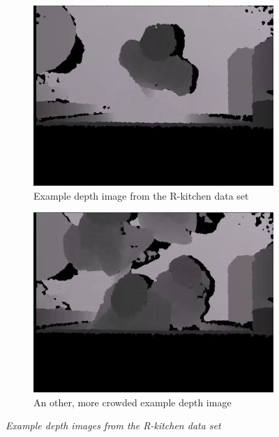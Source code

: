 \begin{figure}[H]
\centering
\begin{subfigure}{.5\textwidth}
  \centering
  \includegraphics[width=0.9\linewidth]{images/R-kitchen1.png}
  \caption{Example depth image from the R-kitchen data set}
  \label{fig:sub1}
\end{subfigure}%
\begin{subfigure}{.5\textwidth}
  \centering
  \includegraphics[width=0.9\linewidth]{images/R-kitchen2.png}
  \caption{An other, more crowded example depth image}
  \label{fig:sub2}
\end{subfigure}
\caption[R-kitchen exits]{\textit{Example depth images from the R-kitchen data set}}
\label{fig:R-kitchen example}
\end{figure}

